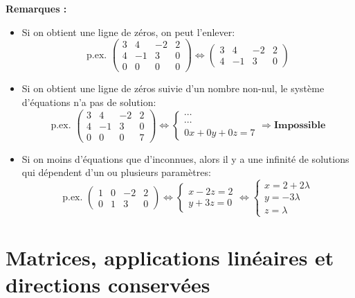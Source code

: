 \textbf{Remarques :} 
\begin{itemize}
\item Si on obtient une ligne de zéros, on peut l'enlever:
\[\text{p.ex. }  \left(\begin{array}{ccc|c} 3 & 4 & -2 & 2 \\ 4 & -1 & 3 & 0 \\ 0 & 0 & 0 & 0 \end{array}\right) \Leftrightarrow  \left(\begin{array}{ccc|c} 3 & 4 & -2 & 2 \\ 4 & -1 & 3 & 0 \end{array}\right) \]
\item Si on obtient une ligne de zéros suivie d'un nombre non-nul, le système d'équations n'a pas de solution:
\[\text{p.ex. }  \left(\begin{array}{ccc|c} 3 & 4 & -2 & 2 \\ 4 & -1 & 3 & 0 \\ 0 & 0 & 0 & 7 \end{array}\right) \Leftrightarrow  \begin{cases} \cdots \\ \cdots \\ 0x + 0y + 0z = 7 \end{cases} \Rightarrow \textbf{Impossible} \]
\item Si on moins d'équations que d'inconnues, alors il y a une infinité de solutions qui dépendent d'un ou plusieurs paramètres:
\[\text{p.ex. }  \left(\begin{array}{ccc|c} 1 & 0 & -2 & 2 \\ 0 & 1 & 3 & 0 \end{array}\right) \Leftrightarrow  \begin{cases} x - 2z = 2 \\ y + 3z = 0 \end{cases} \Leftrightarrow  \begin{cases} x = 2 + 2\lambda \\ y = -3\lambda \\ z = \lambda \end{cases} \]
\end{itemize}

\section{Matrices, applications linéaires et directions conservées}


